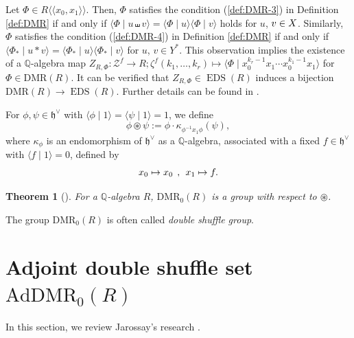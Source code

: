 \documentclass[15pt,oneside,reqno]{amsart}
\newtheorem{thm}[df]{Theorem}
\theoremstyle{remark}{
\newtheorem{lem}[df]{Lemma}
\newtheorem{prop}[df]{Proposition}
\newtheorem{ex}[df]{Example}
\newtheorem{rmk}[df]{Remark}
}
\newcommand{\ide}[1]{\mathfrak{#1}}
\newcommand{\DMR}{\mathrm{DMR}}
\newcommand{\AdDMR}{\mathrm{AdDMR}}
\newcommand{\adls}{\mathfrak{adls}}
\DeclareMathOperator{\EDS}{EDS}
\begin{document}
\begin{rmk}
Let $\Phi \in R \langle \langle x_0,x_1 \rangle \rangle$. Then, $\Phi$ satisfies the condition (\ref{def:DMR-3}) in Definition \ref{def:DMR} if and only if $\langle \Phi \mid u \shuffle v \rangle = \langle \Phi \mid u\rangle \langle \Phi\mid v\rangle$ holds for $u$, $v\in X\*$. Similarly, $\Phi$ satisfies the condition (\ref{def:DMR-4}) in Definition \ref{def:DMR} if and only if $\langle \Phi_* \mid u * v \rangle = \langle \Phi_* \mid u \rangle \langle \Phi_* \mid  v \rangle$ for $u$, $v\in Y^*$. 
This observation implies the existence of a $\mathbb{Q}$-algebra map $Z_{R,\Phi} : \mathcal{Z}^f \rightarrow R ; \zeta^f(k_1,\ldots,k_r) \mapsto \langle \Phi \mid x_0^{k_r-1}x_1\cdots x_0^{k_1-1}x_1 \rangle$ for $\Phi \in \DMR(R)$. It can be verified that $Z_{R,\Phi} \in \EDS(R)$ induces a bijection $\DMR(R) \rightarrow \EDS(R)$. Further details can be found in \cite{Bachmann-Yaddaden}.
\end{rmk}

For $\phi, \psi\in \ide{h}^{\vee}$ with $\langle \phi \mid 1\rangle = \langle \psi \mid 1\rangle = 1$, we define 
\[
\phi \circledast \psi := \phi \cdot \kappa_{\phi^{-1}x_1\phi}(\psi),
\]
where $\kappa_{\phi}$ is an endomorphism of $\ide{h}^{\vee}$ as a $\mathbb{Q}$-algebra, associated with a fixed $f\in \ide{h}^{\vee}$ with $\langle f \mid 1\rangle = 0$, defined by
\[
x_0\mapsto x_0\hspace{1.0ex},\hspace{1.0ex} x_1\mapsto f.
\]



\begin{thm}[{\cite[Th\'{e}or\`{e}m I]{Racinet}}]\label{thm:Racinet-DMR}
For a $\mathbb{Q}$-algebra $R$, $\DMR_0(R)$ is a group with respect to $\circledast$.
\end{thm}
 
The group $\DMR_0(R)$ is often called \textit{double shuffle group}.

\section{Adjoint double shuffle set $\AdDMR_0(R)$} \label{sect:AdDMR}

In this section, we review Jarossay's research \cite{Jarossay}.
\end{document}
